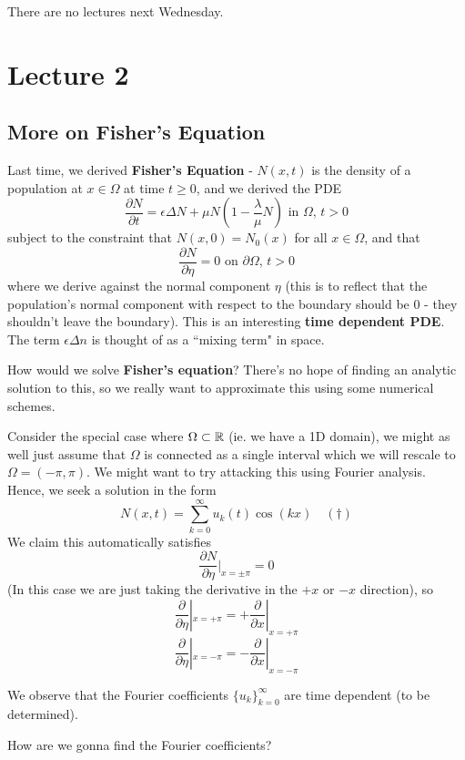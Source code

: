 \documentclass{article}
\begin{document}
There are no lectures next Wednesday.

\newpage

\section{Lecture 2}

\subsection{More on Fisher's Equation}
Last time, we derived \textbf{Fisher's Equation}  - $N(x, t)$ is the density of a population at $x \in \Omega$ at time $t \geq 0$, and we derived the PDE
\[\frac{\partial N}{\partial t} = \epsilon \Delta N + \mu N (1 - \frac{\lambda}{\mu} N) \text{ in $\Omega$, $t > 0$}\]
subject to the constraint that $N(x, 0) = N_0(x)$ for all $x \in \Omega$, and that
\[\frac{\partial N}{\partial \eta} = 0 \text{ on $\partial \Omega$, $t > 0$}\]
where we derive against the normal component $\eta$ (this is to reflect that the population's normal component with respect to the boundary should be 0 - they shouldn't leave the boundary). This is an interesting \textbf{time dependent PDE}.\\

The term $\epsilon \Delta n$ is thought of as a ``mixing term" in space.

\begin{question}
    How would we solve \textbf{Fisher's equation}? There's no hope of finding an analytic solution to this, so we really want to approximate this using some numerical schemes.
\end{question}

Consider the special case where $\Omega \subset \mathbb{R}$ (ie. we have a 1D domain), we might as well just assume that $\Omega$ is connected as a single interval which we will rescale to $\Omega = (-\pi, \pi)$. We might want to try attacking this using Fourier analysis. Hence, we seek a solution in the form 
\[N(x, t) = \sum_{k = 0}^\infty u_k(t) \cos(kx) \quad (\dagger)\]
We claim this automatically satisfies 
\[\frac{\partial N}{\partial \eta}|_{x = \pm \pi} = 0\]
(In this case we are just taking the derivative in the $+x$ or $-x$ direction), so
\[\frac{\partial}{\partial \eta}|_{x = +\pi} = +\frac{\partial}{\partial x}|_{x = +\pi}\]
\[\frac{\partial}{\partial \eta}|_{x = -\pi} = -\frac{\partial}{\partial x}|_{x = -\pi}\]

We observe that the Fourier coefficients $\{u_k\}_{k = 0}^\infty$ are time dependent (to be determined).
\begin{question}
    How are we gonna find the Fourier coefficients?
\end{question}
\end{document}
